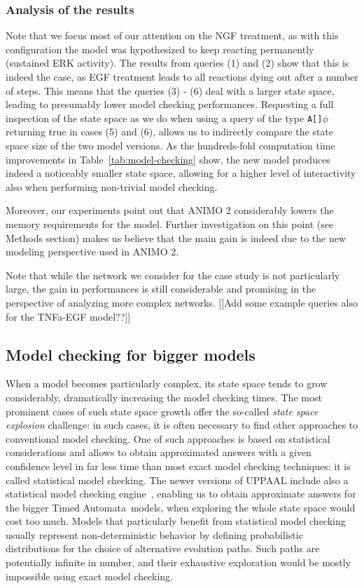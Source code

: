 \documentclass{bmcart}
\def\tas{Timed Automata}
\def\animo2{ANIMO 2}
\begin{document}
\subsubsection*{Analysis of the results}
Note that we focus most of our attention on the NGF treatment, as with this configuration the model
was hypothesized to keep reacting permanently (sustained ERK activity). The results from queries (1) and (2)
show that this is indeed the case, as EGF treatment leads to all reactions dying out after a number of steps.
This means that the queries (3) - (6) deal with a larger state space, leading to presumably lower model checking performances.
Requesting a full inspection of the state space
as we do when using a query of the type {\tt A[]$\phi$} returning true in cases (5) and (6), allows us to indirectly compare the state space size of the two
model versions. As the hundreds-fold computation time improvements in Table~\ref{tab:model-checking} show, the new model produces
indeed a noticeably smaller state space, allowing for a higher level of interactivity also when performing non-trivial model checking.

Moreover, our experiments point out that \animo2{} considerably lowers the memory
requirements for the model. Further investigation on this point (see Methods section)
makes us believe that the main gain is indeed due to the new modeling perspective used in \animo2{}.

Note that while the network we consider for the case study is not particularly large, the gain in performances is still considerable
and promising in the perspective of analyzing more complex networks.
{\Large [[Add some example queries also for the TNFa-EGF model??]]}



\subsection*{Model checking for bigger models}
When a model becomes particularly complex, its state space tends to grow considerably, dramatically
increasing the model checking times. The most prominent cases of such state space growth
offer the so-called \emph{state space explosion} challenge: in such cases,
it is often necessary to find other approaches to conventional model checking. One of such approaches is based on statistical
considerations and allows to obtain approximated answers with a given confidence level in far less time
than most exact model checking techniques: it is called statistical model checking. The newer
versions of UPPAAL include also a statistical model checking engine~\cite{uppaal-smc}, enabling
us to obtain approximate answers for the bigger \tas\ models, when exploring the whole state space would cost too much.
Models that particularly benefit from statistical model checking 
usually represent non-deterministic behavior by defining probabilistic distributions for the
choice of alternative evolution paths. Such paths are potentially infinite in number, and their
exhaustive exploration would be mostly impossible using exact model checking.
\end{document}
